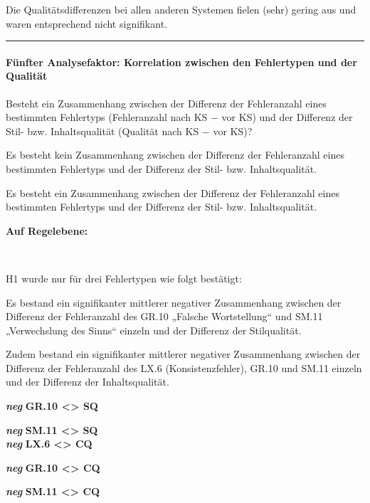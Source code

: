 \medskip
\noindent
\parbox[t]{.75\textwidth}{Die Qualitätsdifferenzen bei allen anderen Systemen fielen (sehr) gering aus und waren entsprechend nicht signifikant.}

\hrule
\paragraph*{Fünfter Analysefaktor: Korrelation zwischen den Fehlertypen und der Qualität}
\begin{description}[font=\normalfont\bfseries]
\item [Fragestellung:] Besteht ein Zusammenhang zwischen der Differenz der Fehleranzahl eines bestimmten Fehlertyps (Fehleranzahl nach KS $-$ vor KS) und der Differenz der Stil- bzw. Inhaltsqualität (Qualität nach KS $-$ vor KS)?
\item [H0 --] Es besteht kein Zusammenhang zwischen der Differenz der Fehleranzahl eines bestimmten Fehlertyps und der Differenz der Stil- bzw. Inhaltsqualität.
\item [H1 --] Es besteht ein Zusammenhang zwischen der Differenz der Fehleranzahl eines bestimmten Fehlertyps und der Differenz der Stil- bzw. Inhaltsqualität.
\item [Resultat]
\end{description}
\noindent
\parbox[t]{.7\textwidth}{\textbf{Auf Regelebene:}}\\
\parbox[t]{.7\textwidth}{
H1 wurde nur für drei Fehlertypen wie folgt bestätigt:

Es bestand ein signifikanter mittlerer negativer Zusammenhang zwischen der Differenz der Fehleranzahl des GR.10 „Falsche Wortstellung“ und SM.11 „Verwechslung des Sinns“ einzeln und der Differenz der Stilqualität.

Zudem bestand ein signifikanter mittlerer negativer Zusammenhang zwischen der Differenz der Fehleranzahl des LX.6 (Konsistenzfehler), GR.10 und SM.11 einzeln und der Differenz der Inhaltsqualität.
}
\parbox[t]{.04\textwidth}{}
\colorbox{smGreen}{\parbox[t]{.25\textwidth}{
{ \textbf{\textit{neg} }\textbf{GR.10 <> SQ}}

{ \textbf{\textit{neg} }\textbf{SM.11 <> SQ}}\\

{ \textbf{\textit{neg} }\textbf{LX.6 <> CQ}}

{ \textbf{\textit{neg} }\textbf{GR.10 <> CQ}}

 \textbf{\textit{neg} }\textbf{SM.11 <> CQ}\\
 \\
 \\
}}

